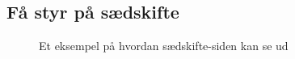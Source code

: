 \subsection{Få styr på sædskifte}
\begin{minipage}{0.4\textwidth}
\begin{figure}[H]
    \centering
    \caption{Et eksempel på hvordan sædskifte-siden kan se ud}
\end{figure}
\end{minipage} \hfill
